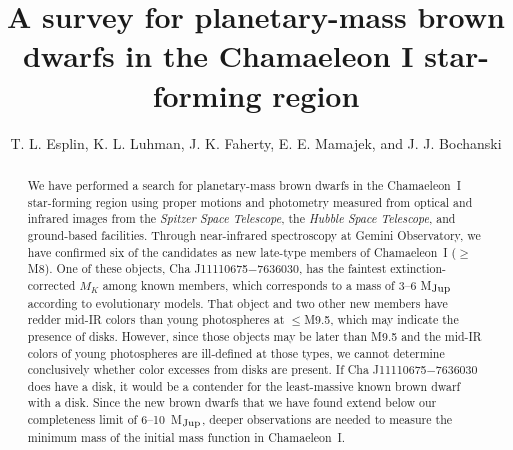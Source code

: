 \documentclass{emulateapj}
\begin{document}

\title{A survey for planetary-mass brown dwarfs in the Chamaeleon I star-forming region}

\author{
T. L. Esplin, 
K. L. Luhman, 
J. K. Faherty,
E. E. Mamajek, 
and J. J. Bochanski
}


\begin{abstract}
We have performed a search for planetary-mass brown dwarfs in the Chamaeleon~I
star-forming region using proper motions and photometry measured from optical
and infrared images from the {\it Spitzer Space Telescope}, the
{\it Hubble Space Telescope}, and ground-based facilities. 
Through near-infrared spectroscopy at Gemini Observatory,
we have confirmed six of the candidates as new late-type members of 
Chamaeleon~I ($\geq$M8). One of these objects, Cha J11110675$-$7636030, 
has the faintest extinction-corrected $M_K$ among known members, which 
corresponds to a mass of 3--6 M$_{\rm Jup}$ according to evolutionary models.
That object and two other new members have redder mid-IR colors than
young photospheres at $\leq$M9.5, which may indicate the presence of disks. 
However, since those objects may be later than M9.5 and the mid-IR colors of
young photospheres are ill-defined at those types, we cannot determine
conclusively whether color excesses from disks are present. 
If Cha J11110675$-$7636030 does have a disk, it would be a contender for the
least-massive known brown dwarf with a disk. Since the new brown
dwarfs that we have found extend below our completeness limit of
6--10~M$_{\rm Jup}$, deeper observations are needed to measure the minimum
mass of the initial mass function in Chamaeleon~I.

\end{abstract}
\end{document}
